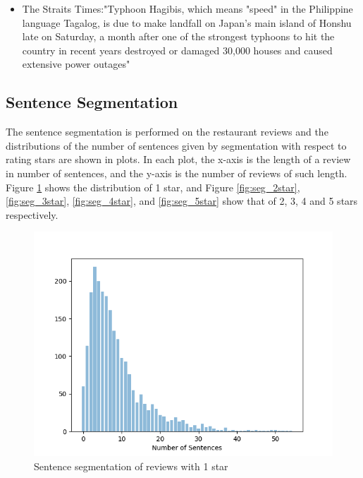 \documentclass[sigconf]{acmart}
\begin{document}
\begin{itemize}
\item{The Straits Times}:"Typhoon Hagibis, which means "speed" in the Philippine language Tagalog, is due to make landfall on Japan's main island of Honshu late on Saturday, a month after one of the strongest typhoons to hit the country in recent years destroyed or damaged 30,000 houses and caused extensive power outages"
\end{itemize}

\subsection{Sentence Segmentation}
The sentence segmentation is performed on the restaurant reviews and the distributions of the number of sentences given by segmentation with respect to rating stars are shown in plots. In each plot, the x-axis is the length of a review in number of sentences, and the y-axis is the number of reviews of such length. Figure \ref{fig:seg_1star} shows the distribution of 1 star, and Figure \ref{fig:seg_2star}, \ref{fig:seg_3star}, \ref{fig:seg_4star}, and \ref{fig:seg_5star} show that of 2, 3, 4 and 5 stars respectively.

\begin{figure}[ht]
  \centering
  \includegraphics[width=\linewidth]{segmentation_1star.png}
  \caption{Sentence segmentation of reviews with 1 star}
  \label{fig:seg_1star}
\end{figure}
\end{document}
